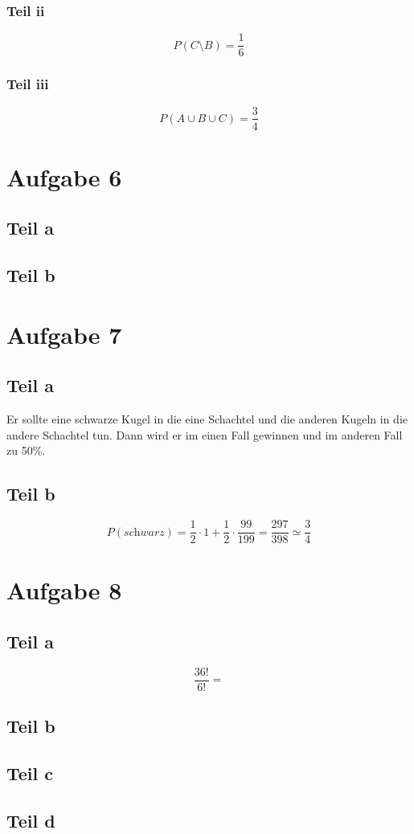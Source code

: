 \documentclass[10pt,a4paper]{article}
\begin{document}
\subsubsection{Teil ii}
\begin{equation}
  P(C \setminus B) = \frac{1}{6}
\end{equation}

\subsubsection{Teil iii}
\begin{equation}
  P(A \cup B \cup C) = \frac{3}{4}
\end{equation}

\section{Aufgabe 6}

\subsection{Teil a}

\subsection{Teil b}

\section{Aufgabe 7}

\subsection{Teil a}
Er sollte eine schwarze Kugel in die eine Schachtel und die anderen Kugeln in die andere Schachtel tun.
Dann wird er im einen Fall gewinnen und im anderen Fall zu 50\%.

\subsection{Teil b}
\begin{equation}
  P(\textit{schwarz}) = \frac{1}{2} \cdot 1 + \frac{1}{2} \cdot \frac{99}{199} = \frac{297}{398} \simeq \frac{3}{4}
\end{equation}

\section{Aufgabe 8}

\subsection{Teil a}
\begin{equation}
  \frac{36!}{6!} = 
\end{equation}

\subsection{Teil b}

\subsection{Teil c}

\subsection{Teil d}
\end{document}
